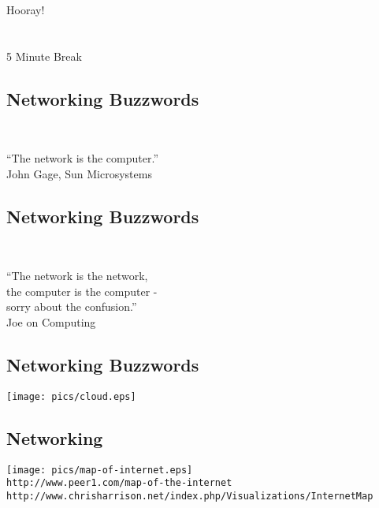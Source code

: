 \documentclass[xga]{xdvislides}
\begin{document}
\newpage
\vspace*{\fill}
\begin{center}
    \Hugesize
        Hooray! \\ [1em]
    \hspace*{5mm}
    \blueline\\
    \hspace*{5mm}\\
        5 Minute Break
\end{center}
\vspace*{\fill}

\subsection{Networking Buzzwords}
\\

\newcommand{\gargantuan}{\fontsize{45}{50}\selectfont}
\gargantuan
\begin{center}
``The network is the computer.'' \\
\small
\vspace*{.5in}
John Gage, Sun Microsystems
\end{center}
\Normalsize

\subsection{Networking Buzzwords}
\\

\gargantuan
\begin{center}
``The network is the network, \\
the computer is the computer - \\
sorry about the confusion.'' \\
\small
\vspace*{.5in}
Joe on Computing
\end{center}
\Normalsize

\subsection{Networking Buzzwords}
\vspace*{\fill}
\begin{center}
	\texttt{[image: pics/cloud.eps]}
\end{center}
\vspace*{\fill}

\subsection{Networking}
\vspace*{\fill}
\begin{center}
	\texttt{[image: pics/map-of-internet.eps]} \\
	\vspace*{\fill}
	\small
	\verb+http://www.peer1.com/map-of-the-internet+ \\
	\verb+http://www.chrisharrison.net/index.php/Visualizations/InternetMap+
	\Normalsize
\end{center}
\end{document}
